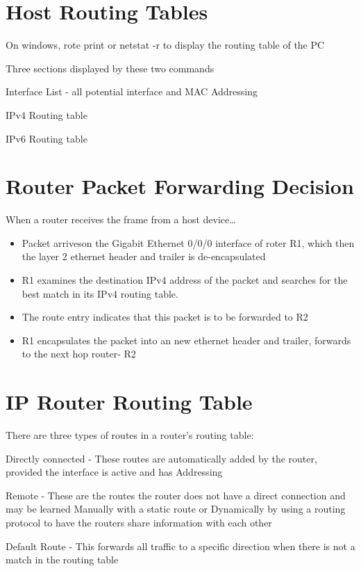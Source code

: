 \documentclass{article}
\begin{document}
\section{\textbf{Host Routing Tables}}

\begin{flushleft}
    On windows, rote print or netstat -r to display the routing table of the PC

    Three sections displayed by these two commands

    Interface List - all potential interface and MAC Addressing
    
    IPv4 Routing table

    IPv6 Routing table
\end{flushleft}


\section{\textbf{Router Packet Forwarding Decision}}

\begin{flushleft}
    When a router receives the frame from a host device\dots

    \begin{itemize}
        \item Packet arriveson the Gigabit Ethernet 0/0/0 interface of roter R1, which then the layer 2 ethernet header and trailer is de-encapsulated
        \item R1 examines the destination IPv4 address of the packet and searches for the best match in its IPv4 routing table.
        \item The route entry indicates that this packet is to be forwarded to R2
        \item R1 encapsulates the packet into an new ethernet header and trailer, forwards to the next hop router- R2
    \end{itemize}
\end{flushleft}


\section{\textbf{IP Router Routing Table}}

\begin{flushleft}
    There are three types of routes in a router's routing table:

    Directly connected - These routes are automatically added by the router, provided the interface is active and has Addressing

    Remote - These are the routes the router does not have a direct connection and may be learned Manually with a static route or Dynamically
    by using a routing protocol to have the routers share information with each other

    Default Route - This forwards all traffic to a specific direction when there is not a match in the routing table
\end{flushleft}
\end{document}
